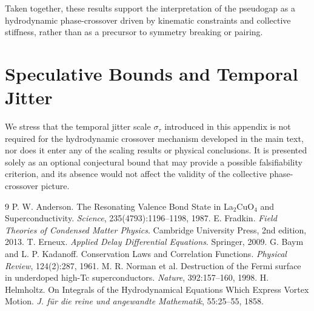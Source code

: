 \documentclass[11pt, a4paper]{article}
\begin{document}
            Taken together, these results support the interpretation of the pseudogap as a hydrodynamic phase-crossover driven by kinematic constraints and collective stiffness, rather than as a precursor to symmetry breaking or pairing.

            \appendix
        \section{Speculative Bounds and Temporal Jitter}

            We stress that the temporal jitter scale $\sigma_\tau$ introduced in this appendix is not required for the hydrodynamic crossover mechanism developed in the main text, nor does it enter any of the scaling results or physical conclusions. It is presented solely as an optional conjectural bound that may provide a possible falsifiability criterion, and its absence would not affect the validity of the collective phase-crossover picture.

            \begin{thebibliography}{9}
                 P. W. Anderson. The Resonating Valence Bond State in La$_2$CuO$_4$ and Superconductivity. \textit{Science}, 235(4793):1196--1198, 1987.
                 E. Fradkin. \textit{Field Theories of Condensed Matter Physics}. Cambridge University Press, 2nd edition, 2013.
                 T. Erneux. \textit{Applied Delay Differential Equations}. Springer, 2009.
                 G. Baym and L. P. Kadanoff. Conservation Laws and Correlation Functions. \textit{Physical Review}, 124(2):287, 1961.
                 M. R. Norman et al. Destruction of the Fermi surface in underdoped high-Tc superconductors. \textit{Nature}, 392:157--160, 1998.
                 H. Helmholtz. On Integrals of the Hydrodynamical Equations Which Express Vortex Motion. \textit{J. für die reine und angewandte Mathematik}, 55:25--55, 1858.
            \end{thebibliography}
\end{document}
